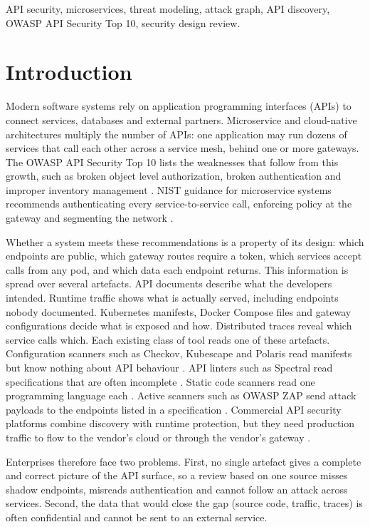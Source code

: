 \documentclass[conference]{IEEEtran}
\begin{document}
\begin{IEEEkeywords}
API security, microservices, threat modeling, attack graph, API discovery, OWASP API Security Top 10, security design review.
\end{IEEEkeywords}

\section{Introduction}
Modern software systems rely on application programming interfaces (APIs) to connect services, databases and external partners. Microservice and cloud-native architectures multiply the number of APIs: one application may run dozens of services that call each other across a service mesh, behind one or more gateways. The OWASP API Security Top 10 lists the weaknesses that follow from this growth, such as broken object level authorization, broken authentication and improper inventory management \cite{owasp_api_2023}. NIST guidance for microservice systems recommends authenticating every service-to-service call, enforcing policy at the gateway and segmenting the network \cite{nist_800_204,nist_800_207}.

Whether a system meets these recommendations is a property of its design: which endpoints are public, which gateway routes require a token, which services accept calls from any pod, and which data each endpoint returns. This information is spread over several artefacts. API documents describe what the developers intended. Runtime traffic shows what is actually served, including endpoints nobody documented. Kubernetes manifests, Docker Compose files and gateway configurations decide what is exposed and how. Distributed traces reveal which service calls which. Each existing class of tool reads one of these artefacts. Configuration scanners such as Checkov, Kubescape and Polaris read manifests but know nothing about API behaviour \cite{checkov,kubescape,polaris}. API linters such as Spectral read specifications that are often incomplete \cite{spectral}. Static code scanners read one programming language each \cite{bandit,gosec,njsscan}. Active scanners such as OWASP ZAP send attack payloads to the endpoints listed in a specification \cite{zap}. Commercial API security platforms combine discovery with runtime protection, but they need production traffic to flow to the vendor's cloud or through the vendor's gateway \cite{ibm_apic,salt,akamai_api}.

Enterprises therefore face two problems. First, no single artefact gives a complete and correct picture of the API surface, so a review based on one source misses shadow endpoints, misreads authentication and cannot follow an attack across services. Second, the data that would close the gap (source code, traffic, traces) is often confidential and cannot be sent to an external service.
\end{document}
